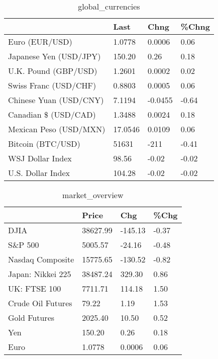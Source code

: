 \documentclass{article}%
\begin{document}
%


\begin{table}[htbp]%
\caption{global\_currencies}%
\centering%
\begin{adjustbox}{width=1\textwidth}%
\begin{tabular}{llll}
\toprule
                       &    Last &    Chng & \%Chng \\
\midrule
        Euro (EUR/USD) &  1.0778 &  0.0006 &  0.06 \\
Japanese Yen (USD/JPY) &  150.20 &    0.26 &  0.18 \\
  U.K. Pound (GBP/USD) &  1.2601 &  0.0002 &  0.02 \\
 Swiss Franc (USD/CHF) &  0.8803 &  0.0005 &  0.06 \\
Chinese Yuan (USD/CNY) &  7.1194 & -0.0455 & -0.64 \\
  Canadian \$ (USD/CAD) &  1.3488 &  0.0024 &  0.18 \\
Mexican Peso (USD/MXN) & 17.0546 &  0.0109 &  0.06 \\
     Bitcoin (BTC/USD) &   51631 &    -211 & -0.41 \\
      WSJ Dollar Index &   98.56 &   -0.02 & -0.02 \\
     U.S. Dollar Index &  104.28 &   -0.02 & -0.02 \\
\bottomrule
\end{tabular}
%
\end{adjustbox}%
\end{table}

%


\begin{table}[htbp]%
\caption{market\_overview}%
\centering%
\begin{adjustbox}{width=1\textwidth}%
\begin{tabular}{llll}
\toprule
                  &    Price &     Chg &  \%Chg \\
\midrule
             DJIA & 38627.99 & -145.13 & -0.37 \\
          S\&P 500 &  5005.57 &  -24.16 & -0.48 \\
 Nasdaq Composite & 15775.65 & -130.52 & -0.82 \\
Japan: Nikkei 225 & 38487.24 &  329.30 &  0.86 \\
     UK: FTSE 100 &  7711.71 &  114.18 &  1.50 \\
Crude Oil Futures &    79.22 &    1.19 &  1.53 \\
     Gold Futures &  2025.40 &   10.50 &  0.52 \\
              Yen &   150.20 &    0.26 &  0.18 \\
             Euro &   1.0778 &  0.0006 &  0.06 \\
\bottomrule
\end{tabular}
%
\end{adjustbox}%
\end{table}

%
\end{document}
